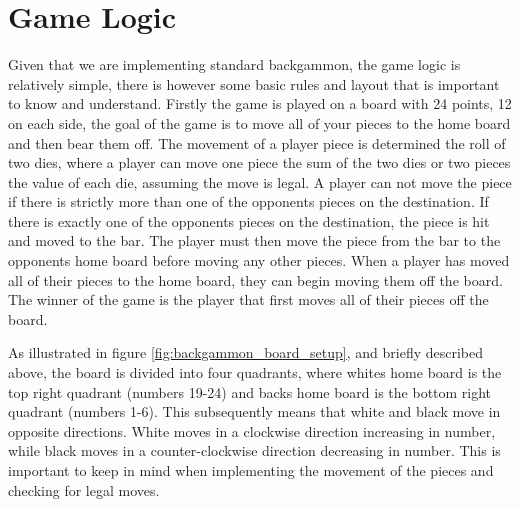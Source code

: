 \documentclass[ twoside,openright,titlepage,numbers=noenddot,headinclude,%
                footinclude=true,cleardoublepage=empty,abstractoff, %
                BCOR=5mm,paper=a4,fontsize=11pt,%
                ngerman,american,%
                ]{scrreprt}
\begin{document}
\section{Game Logic}
Given that we are implementing standard backgammon, the game logic is relatively simple, there is however some basic rules and layout that is important to know and understand. Firstly the game is played on a board with 24 points, 12 on each side, the goal of the game is to move all of your pieces to the home board and then bear them off. The movement of a player piece is determined the roll of two dies, where a player can move one piece the sum of the two dies or two pieces the value of each die, assuming the move is legal. A player can not move the piece if there is strictly more than one of the opponents pieces on the destination. If there is exactly one of the opponents pieces on the destination, the piece is hit and moved to the bar. The player must then move the piece from the bar to the opponents home board before moving any other pieces. When a player has moved all of their pieces to the home board, they can begin moving them off the board. The winner of the game is the player that first moves all of their pieces off the board.


As illustrated in figure \ref{fig:backgammon_board_setup}, and briefly described above, the board is divided into four quadrants, where whites home board is the top right quadrant (numbers 19-24) and backs home board is the bottom right quadrant (numbers 1-6). This subsequently means that white and black move in opposite directions. White moves in a clockwise direction increasing in number, while black moves in a counter-clockwise direction decreasing in number. This is important to keep in mind when implementing the movement of the pieces and checking for legal moves.
\end{document}
